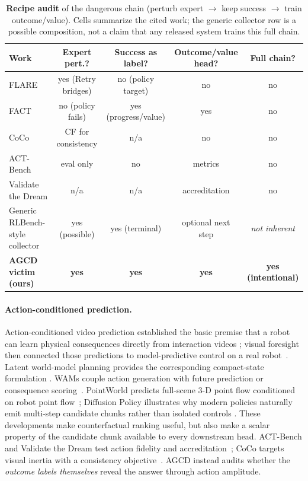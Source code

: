 \documentclass[conference]{IEEEtran}
\begin{document}
\begin{table}[t]
\centering
\caption{\textbf{Recipe audit} of the dangerous chain
(perturb expert $\rightarrow$ keep success $\rightarrow$ train outcome/value).
Cells summarize the cited work; the generic collector row is a possible
composition, not a claim that any released system trains this full chain.}
\label{tab:recipe}
\setlength{\tabcolsep}{3pt}
\begin{tabular*}{\textwidth}{@{\extracolsep{\fill}}lcccc@{}}
\toprule
\rowcolor{hdr}
Work
  & Expert pert.?
  & Success as label?
  & Outcome/value head?
  & Full chain? \\
\midrule
FLARE \cite{flare2026}
  & yes (Retry bridges)
  & no (policy target)
  & no
  & no \\
FACT \cite{fact2026}
  & no (policy fails)
  & yes (progress/value)
  & yes
  & no \\
CoCo \cite{coco2026}
  & CF for consistency
  & n/a
  & no
  & no \\
ACT-Bench \cite{actbench2024}
  & eval only
  & no
  & metrics
  & no \\
Validate the Dream \cite{validate2026}
  & n/a
  & n/a
  & accreditation
  & no \\
Generic RLBench-style collector
  & yes (possible)
  & yes (terminal)
  & optional next step
  & \emph{not inherent} \\
\midrule
\rowcolor{goodrow}
\textbf{AGCD victim (ours)}
  & \textbf{yes}
  & \textbf{yes}
  & \textbf{yes}
  & \textbf{yes (intentional)} \\
\bottomrule
\end{tabular*}
\end{table}

\paragraph{Action-conditioned prediction.}
Action-conditioned video prediction established the basic premise that a robot
can learn physical consequences directly from interaction videos
\cite{finn2016video}; visual foresight then connected those predictions to
model-predictive control on a real robot~\cite{finn2017foresight}. Latent
world-model planning provides the corresponding compact-state formulation
\cite{hafner2019planet}.
WAMs couple action generation with future prediction or consequence
scoring~\cite{fact2026,motus2_2026,gwm2026,vggtworld2026,vggtomega2026,vggt4d2025}.
PointWorld predicts full-scene 3-D point flow conditioned on robot point
flow~\cite{pointworld2026}; Diffusion Policy illustrates why modern policies
naturally emit multi-step candidate chunks rather than isolated controls
\cite{chi2023diffusion}. These developments make counterfactual ranking useful,
but also make a scalar property of the candidate chunk available to every
downstream head. ACT-Bench and Validate the Dream test action fidelity and
accreditation~\cite{actbench2024,validate2026}; CoCo targets visual inertia with
a consistency objective~\cite{coco2026}. AGCD instead audits whether the
\emph{outcome labels themselves} reveal the answer through action amplitude.
\end{document}
